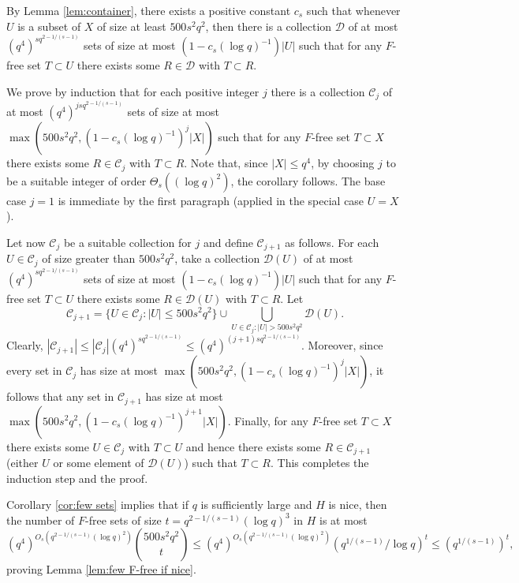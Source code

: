 \documentclass[11pt]{article}
\let\oldendproof\endproof
\renewenvironment{proof}[1][\proofname]{\oldproof[\bf #1]}{\oldendproof}
\theoremstyle{plain}
\theoremstyle{definition}
\begin{document}
\begin{proof}
    By Lemma \ref{lem:container}, there exists a positive constant $c_s$ such that whenever $U$ is a subset of $X$ of size at least $500s^2q^2$, then there is a collection $\mathcal{D}$ of at most $(q^4)^{sq^{2-1/(s-1)}}$ sets of size at most $(1-c_s(\log q)^{-1})|U|$ such that for any $F$-free set $T\subset U$ there exists some $R\in \mathcal{D}$ with $T\subset R$.

    We prove by induction that for each positive integer $j$ there is a collection $\mathcal{C}_j$ of at most $(q^4)^{jsq^{2-1/(s-1)}}$ sets of size at most $\max\left(500s^2q^2,(1-c_s(\log q)^{-1})^j|X|\right)$ such that for any $F$-free set $T\subset X$ there exists some $R\in \mathcal{C}_j$ with $T\subset R$. Note that, since $|X| \leq q^4$, by choosing $j$ to be a suitable integer of order $\Theta_s((\log q)^{2})$, the corollary follows. The base case $j=1$ is immediate by the first paragraph (applied in the special case $U=X$).

    Let now $\mathcal{C}_j$ be a suitable collection for $j$ and define $\mathcal{C}_{j+1}$ as follows. For each $U\in \mathcal{C}_j$ of size greater than $500s^2q^2$, take a collection $\mathcal{D}(U)$ of at most $(q^4)^{sq^{2-1/(s-1)}}$ sets of size at most $(1-c_s(\log q)^{-1})|U|$ such that for any $F$-free set $T\subset U$ there exists some $R\in \mathcal{D}(U)$ with $T\subset R$. Let $$\mathcal{C}_{j+1}=\{U\in \mathcal{C}_j:|U|\leq 500s^2q^2\}\cup \bigcup_{U\in \mathcal{C}_j:|U|>500s^2q^2} \mathcal{D}(U).$$
    Clearly, $|\mathcal{C}_{j+1}|\leq |\mathcal{C}_j|(q^4)^{sq^{2-1/(s-1)}}\leq (q^4)^{(j+1)sq^{2-1/(s-1)}}$.
    \sloppy Moreover, since every set in $\mathcal{C}_j$ has size at most $\max\left(500s^2q^2,(1-c_s(\log q)^{-1})^j|X|\right)$, it follows that any set in $\mathcal{C}_{j+1}$ has size at most $\max\left(500s^2q^2,(1-c_s(\log q)^{-1})^{j+1}|X|\right)$. Finally, for any $F$-free set $T\subset X$ there exists some $U\in \mathcal{C}_j$ with $T\subset U$ and hence there exists some $R\in \mathcal{C}_{j+1}$ (either $U$ or some element of $\mathcal{D}(U)$) such that $T\subset R$. This completes the induction step and the proof.
\end{proof}

Corollary \ref{cor:few sets} implies that if $q$ is sufficiently large and $H$ is nice, then the number of $F$-free sets of size $t=q^{2-1/(s-1)}(\log q)^{3}$ in $H$ is at most $$(q^4)^{O_s(q^{2-1/(s-1)}(\log q)^{2})}\binom{500s^2q^2}{t}\leq (q^4)^{O_s(q^{2-1/(s-1)}(\log q)^{2})}(q^{1/(s-1)}/\log q)^t\leq (q^{1/(s-1)})^t,$$
proving Lemma \ref{lem:few F-free if nice}.
\end{document}
